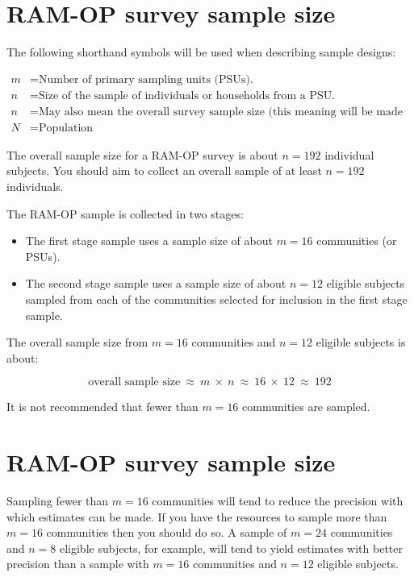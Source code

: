 \documentclass[12pt,a4paper]{book}
\theoremstyle{definition}
\theoremstyle{definition}
\theoremstyle{definition}
\theoremstyle{remark}
\begin{document}
\hypertarget{ram-op-survey-sample-size}{%
\section{RAM-OP survey sample size}\label{ram-op-survey-sample-size}}

The following shorthand symbols will be used when describing sample
designs:

\begin{align*}
m &= \text{Number of primary sampling units (PSUs).} \\
n &= \text{Size of the sample of individuals or households from a PSU.} \\
n &= \text{May also mean the overall survey sample size (this meaning will be made clear in the text).} \\
N &= \text{Population}
\end{align*}

The overall sample size for a RAM-OP survey is about \(n = 192\)
individual subjects. You should aim to collect an overall sample of at
least \(n = 192\) individuals.

The RAM-OP sample is collected in two stages:

\begin{itemize}
\item
  The first stage sample uses a sample size of about \(m = 16\)
  communities (or PSUs).
\item
  The second stage sample uses a sample size of about \(n = 12\)
  eligible subjects sampled from each of the communities selected for
  inclusion in the first stage sample.
\end{itemize}

The overall sample size from \(m = 16\) communities and \(n = 12\)
eligible subjects is about:

\[ \text{overall sample size} ~ \approx ~ m ~ \times ~ n ~ \approx ~ 16 ~ \times ~ 12 ~ \approx ~ 192 \]

It is not recommended that fewer than \(m = 16\) communities are
sampled.

\hypertarget{ram-op-survey-sample-size-1}{%
\section{RAM-OP survey sample size}\label{ram-op-survey-sample-size-1}}

Sampling fewer than \(m = 16\) communities will tend to reduce the
precision with which estimates can be made. If you have the resources to
sample more than \(m = 16\) communities then you should do so. A sample
of \(m = 24\) communities and \(n = 8\) eligible subjects, for example,
will tend to yield estimates with better precision than a sample with
\(m = 16\) communities and \(n = 12\) eligible subjects.
\end{document}
